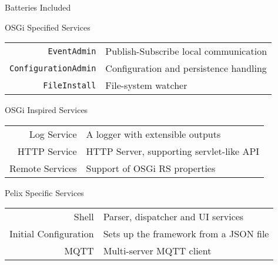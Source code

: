 \begin{frame}{Batteries Included}
\begin{block}{OSGi Specified Services}
\begin{small}
\begin{tabular}{rl}
\texttt{EventAdmin} & Publish-Subscribe local communication \\
\texttt{ConfigurationAdmin} & Configuration and persistence handling \\
\texttt{FileInstall} & File-system watcher \\
\end{tabular}
\end{small}
\end{block}

\begin{block}{OSGi Inspired Services}
\begin{small}
\begin{tabular}{rl}
Log Service & A logger with extensible outputs \\
HTTP Service & HTTP Server, supporting servlet-like API \\
Remote Services & Support of OSGi RS properties \\
\end{tabular}
\end{small}
\end{block}

\begin{block}{Pelix Specific Services}
\begin{small}
\begin{tabular}{rl}
Shell & Parser, dispatcher and UI services \\
Initial Configuration & Sets up the framework from a JSON file \\
MQTT & Multi-server MQTT client \\
\end{tabular}
\end{small}
\end{block}
\end{frame}
